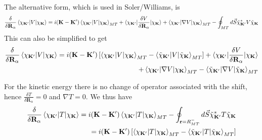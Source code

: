 \documentclass[aps,prb,floatfix,epsfig,singlecolumn,showpacs,preprintnumbers]{revtex4}
\newcommand{\vR}{{\mathbf{R}}}
\renewcommand{\vr}{{\mathbf{r}}}
\newcommand{\vK}{{\mathbf{K}}}
\begin{document}
The alternative form, which is used in Soler/Williams, is
\begin{eqnarray}
\frac{\delta}{\delta \vR_\alpha} \braket{\chi_{\vK'}|V|\chi_{\vK}} = 
i(\vK-\vK')\braket{\chi_{\vK'}|V|\chi_\vK}_{MT} 
+ \braket{\chi_{\vK'}|\frac{\delta V}{\delta \vR_\alpha}|\chi_\vK}
+ \braket{\chi_{\vK'}|\nabla V|\chi_\vK}_{MT} 
-\oint_{MT} d\vec{S} \tilde{\chi}_{\vK'}^* V  \tilde{\chi}_{\vK}
\label{Eq:386}
\end{eqnarray}
This can also be simplified to get
\begin{eqnarray}
\frac{\delta}{\delta \vR_\alpha} \braket{\chi_{\vK'}|V|\chi_{\vK}} =
i(\vK-\vK')
\left[
\braket{\chi_{\vK'}|V|\chi_\vK}_{MT}
-\braket{\tilde{\chi}_{\vK'}|V|\tilde{\chi}_\vK}_{MT}
\right]
+\braket{\chi_{\vK'}|\frac{\delta V}{\delta\vR_\alpha}|\chi_\vK}
\nonumber\\
+\braket{ \chi_{\vK'}|\nabla V|\chi_\vK}_{MT}
-\braket{\tilde{\chi}_{\vK'}|\nabla V|\tilde{\chi}_\vK}_{MT}
\label{Eq:388}
\end{eqnarray}

For the kinetic energy there is no change of operator associated with
the shift, hence $\frac{\delta T}{\delta\vR_\alpha}=0$ and 
$\nabla T=0 $.
We thus have
\begin{eqnarray}
\frac{\delta}{\delta \vR_\alpha} \braket{\chi_{\vK'}|T|\chi_{\vK}} = 
i(\vK-\vK')\braket{\chi_{\vK'}|T|\chi_\vK}_{MT} 
-\oint_{\vr=R_{MT}^-} d\vec{S} \tilde{\chi}_{\vK'}^* T  \tilde{\chi}_{\vK}
\nonumber\\
=i(\vK-\vK')
\left[\braket{\chi_{\vK'}|T|\chi_\vK}_{MT} 
-\braket{\tilde{\chi}_{\vK'}|T|\tilde{\chi}_\vK}_{MT} 
\right]
\label{Eq:389}
\end{eqnarray}
\end{document}
